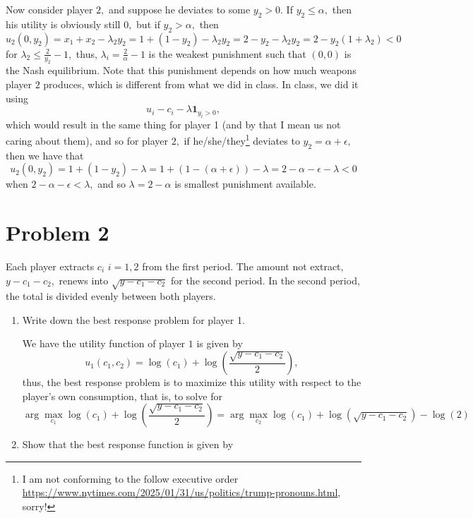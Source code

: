 \documentclass[11pt]{article}
\begin{document}
\begin{problem}
\begin{enumerate}
\begin{solution}
        Now consider player $2,$ and suppose he deviates to some $y_2 >0.$ If $y_2 \leq \alpha,$ then his utility is obviously still $0,$ but if $y_2 >\alpha,$ then 
        \[u_2(0,y_2) = x_1 +x_2 - \lambda_2  y_2 = 1 + (1-y_2) - \lambda_2 y_2 = 2 - y_2 - \lambda_2 y_2 = 2-y_2(1 + \lambda_2) < 0\] for $\lambda_2 \leq \frac{2}{y_2} - 1,$ thus, $\lambda_i = \frac{2}{\alpha} - 1$ is the weakest punishment such that $(0,0)$ is the Nash equilibrium. Note that this punishment depends on how much weapons player $2$ produces, which is different from what we did in class. In class, we did it using 
    \[u_i - c_i - \lambda \mathbf{1}_{y_i>0},\] which would result in the same thing for player 1 (and by that I mean us not caring about them), and so for player $2,$ if he/she/they\footnote{I am not conforming to the follow executive order \url{https://www.nytimes.com/2025/01/31/us/politics/trump-pronouns.html}, sorry!} deviates to $y_2 = \alpha + \epsilon,$ then we have that 
    \[u_2(0,y_2) = 1 +(1-y_2) - \lambda  = 1 + (1 - (\alpha + \epsilon)) - \lambda = 2-\alpha -\epsilon -\lambda <0\] when $2 -\alpha - \epsilon < \lambda,$ and so $\lambda = 2-\alpha$ is smallest punishment available.
    \end{solution}
\end{enumerate}

\newpage
\section*{Problem 2}
\begin{problem}
Each player extracts $c_i$ $i = 1,2$ from the first period. The amount not extract, $y - c_1 - c_2,$ renews into $\sqrt{y-c_1 - c_2}$ for the second period. In the second period, the total is divided evenly between both players. 
\begin{enumerate}
    \item Write down the best response problem for player 1.
    \begin{solution}
        We have the utility function of player $1$ is given by 
        \[u_1(c_1, c_2) = \log(c_1) + \log(\frac{\sqrt{y- c_1 -c_2}}{2}),\] thus, the best response problem is to maximize this utility with respect to the player's own consumption, that is, to solve for 
        \[\arg\max_{c_1}\log(c_1) + \log(\frac{\sqrt{y- c_1 -c_2}}{2}) = \arg\max_{c_2}\log(c_1) + \log(\sqrt{y - c_1 - c_2}) - \log(2)\]
    \end{solution}
    \item 
    Show that the best response function is given by



\end{enumerate}
\end{problem}
\end{problem}
\end{document}
